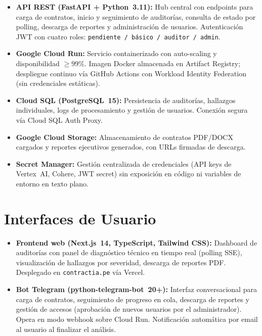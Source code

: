 \begin{itemize}
    \item \textbf{API REST (FastAPI + Python~3.11):} Hub central con
    endpoints para carga de contratos, inicio y seguimiento de auditorías,
    consulta de estado por polling, descarga de reportes y administración
    de usuarios. Autenticación JWT con cuatro roles:
    \texttt{pendiente / básico / auditor / admin}.
    \item \textbf{Google Cloud Run:} Servicio containerizado con auto-scaling
    y disponibilidad $\geq 99\%$. Imagen Docker almacenada en Artifact
    Registry; despliegue continuo vía GitHub Actions con Workload Identity
    Federation (sin credenciales estáticas).
    \item \textbf{Cloud SQL (PostgreSQL~15):} Persistencia de auditorías,
    hallazgos individuales, logs de procesamiento y gestión de usuarios.
    Conexión segura vía Cloud SQL Auth Proxy.
    \item \textbf{Google Cloud Storage:} Almacenamiento de contratos PDF/DOCX
    cargados y reportes ejecutivos generados, con URLs firmadas de descarga.
    \item \textbf{Secret Manager:} Gestión centralizada de credenciales
    (API keys de Vertex~AI, Cohere, JWT secret) sin exposición en código
    ni variables de entorno en texto plano.
\end{itemize}

\section{Interfaces de Usuario}

\begin{itemize}
    \item \textbf{Frontend web (Next.js~14, TypeScript, Tailwind CSS):}
    Dashboard de auditorías con panel de diagnóstico técnico en tiempo real
    (polling SSE), visualización de hallazgos por severidad, descarga de
    reportes PDF. Desplegado en \texttt{contractia.pe} vía Vercel.
    \item \textbf{Bot Telegram (python-telegram-bot~20+):} Interfaz
    conversacional para carga de contratos, seguimiento de progreso en cola,
    descarga de reportes y gestión de accesos (aprobación de nuevos usuarios
    por el administrador). Opera en modo webhook sobre Cloud Run.
    Notificación automática por email al usuario al finalizar el análisis.
\end{itemize}

